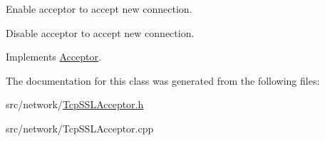 Enable acceptor to accept new connection. 

Disable acceptor to accept new connection. 

Implements \hyperlink{class_acceptor_a624e3c004d6bdc7c1b5238aef1bb2e29}{Acceptor}.



The documentation for this class was generated from the following files\-:\begin{DoxyCompactItemize}
\item 
src/network/\hyperlink{_tcp_s_s_l_acceptor_8h}{Tcp\-S\-S\-L\-Acceptor.\-h}\item 
src/network/Tcp\-S\-S\-L\-Acceptor.\-cpp\end{DoxyCompactItemize}
